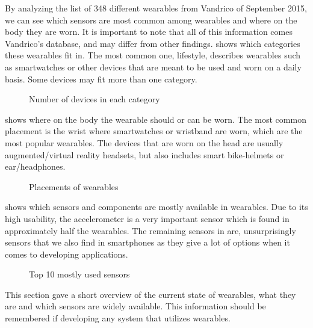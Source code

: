 By analyzing the list of 348 different wearables from Vandrico\cite{LISTOFWEARABLES} of September 2015, we can see which sensors are most common among wearables and where on the body they are worn. It is important to note that all of this information comes Vandrico's database, and may differ from other findings.  shows which categories these wearables fit in. The most common one, lifestyle, describes wearables such as smartwatches or other devices that are meant to be used and worn on a daily basis. Some devices may fit more than one category.

\begin{figure}[!htb]
    \centering
    
    \caption{Number of devices in each category}
    \label{fig:wearables-category}
\end{figure}

 shows where on the body the wearable should or can be worn. The most common placement is the wrist where smartwatches or wristband are worn, which are the most popular wearables. The devices that are worn on the head are usually augmented/virtual reality headsets, but also includes smart bike-helmets or ear/headphones.

\begin{figure}[!htb]
  \centering
  
  \caption{Placements of wearables}
  \label{fig:wearables-placement}
\end{figure}

 shows which sensors and components are mostly available in wearables. Due to its high usability, the accelerometer is a very important sensor which is found in approximately half the wearables. The remaining sensors in  are, unsurprisingly sensors that we also find in smartphones as they give a lot of options when it comes to developing applications. 
\begin{figure}[!htb]
    \centering
    
    \caption{Top 10 mostly used sensors}
    \label{fig:wearables-sensors}
\end{figure}

This section gave a short overview of the current state of wearables, what they are and which sensors are widely available. This information should be remembered if developing any system that utilizes wearables. 

